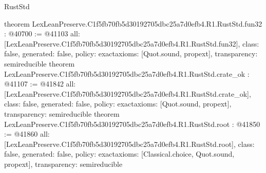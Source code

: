 \begin{lexlean}{RustStd}
\begin{coremodule}
{}
theorem LexLeanPreserve.C1f5fb70fb5d30192705dbc25a7d0efb4.R1.RustStd.fun32 : @40700 := @41103 {
  all: [LexLeanPreserve.C1f5fb70fb5d30192705dbc25a7d0efb4.R1.RustStd.fun32],
  class: false,
  generated: false,
  policy: exact{axioms: [Quot.sound, propext]},
  transparency: semireducible
}
theorem LexLeanPreserve.C1f5fb70fb5d30192705dbc25a7d0efb4.R1.RustStd.crate_ok : @41107 := @41842 {
  all: [LexLeanPreserve.C1f5fb70fb5d30192705dbc25a7d0efb4.R1.RustStd.crate_ok],
  class: false,
  generated: false,
  policy: exact{axioms: [Quot.sound, propext]},
  transparency: semireducible
}
theorem LexLeanPreserve.C1f5fb70fb5d30192705dbc25a7d0efb4.R1.RustStd.root : @41850 := @41860 {
  all: [LexLeanPreserve.C1f5fb70fb5d30192705dbc25a7d0efb4.R1.RustStd.root],
  class: false,
  generated: false,
  policy: exact{axioms: [Classical.choice, Quot.sound, propext]},
  transparency: semireducible
}


\end{coremodule}
\end{lexlean}
